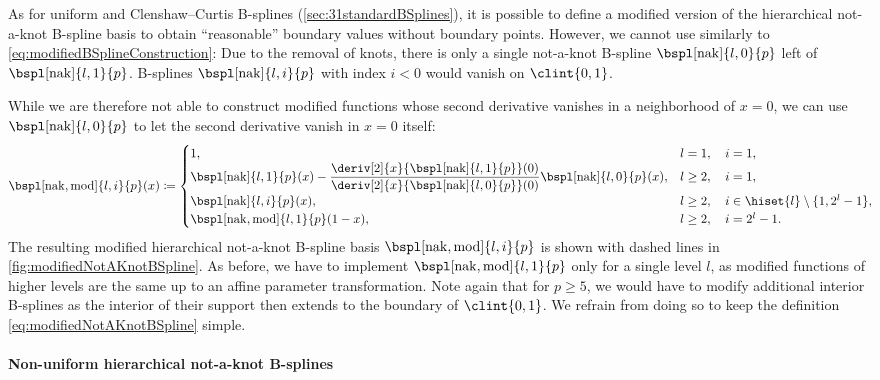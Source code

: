 As for uniform and Clenshaw--Curtis B-splines
(\cref{sec:31standardBSplines}),
it is possible to define a modified version of the
hierarchical not-a-knot B-spline basis to obtain
``reasonable'' boundary values without boundary points.
However, we cannot use  similarly to
\eqref{eq:modifiedBSplineConstruction}:
Due to the removal of knots, there is only a single
not-a-knot B-spline $\bspl[\nak]{l,0}{p}$ left of
$\bspl[\nak]{l,1}{p}$.
B-splines $\bspl[\nak]{l,i}{p}$ with index $i < 0$
would vanish on $\clint{0, 1}$.

While we are therefore not able to construct modified functions
whose second derivative vanishes in a neighborhood of $x = 0$,
we can use $\bspl[\nak]{l,0}{p}$ to let the
second derivative vanish in $x = 0$ itself:
\begin{equation}
  \label{eq:modifiedNotAKnotBSpline}
  \bspl[\nak,\modified]{l,i}{p}(x)
  \ceq
  \begin{cases}
    1,&
    l = 1,\quad i = 1,\\
    \bspl[\nak]{l,1}{p}(x)
    - \dfrac{\deriv[2]{x}{\bspl[\nak]{l,1}{p}}(0)}%
    {\deriv[2]{x}{\bspl[\nak]{l,0}{p}}(0)}
    \bspl[\nak]{l,0}{p}(x),&
    l \ge 2,\quad i = 1,\\
    \bspl[\nak]{l,i}{p}(x),&
    l \ge 2,\quad i \in \hiset{l} \setminus \{1, 2^l - 1\},\\
    \bspl[\nak,\modified]{l,1}{p}(1 - x),&
    l \ge 2,\quad i = 2^l - 1.
  \end{cases}
  \hspace*{-2mm}
\end{equation}
The resulting modified hierarchical not-a-knot B-spline basis
$\bspl[\nak,\modified]{l,i}{p}$ is shown with dashed lines
in \cref{fig:modifiedNotAKnotBSpline}.
As before, we have to implement $\bspl[\nak,\modified]{l,1}{p}$
only for a single level $l$, as modified functions of higher levels
are the same up to an affine parameter transformation.
Note again that for $p \ge 5$, we would have to modify additional
interior B-splines as the interior of their support then extends to the
boundary of $\clint{0, 1}$.
We refrain from doing so to keep the definition
\eqref{eq:modifiedNotAKnotBSpline} simple.

\paragraph{Non-uniform hierarchical not-a-knot B-splines}

